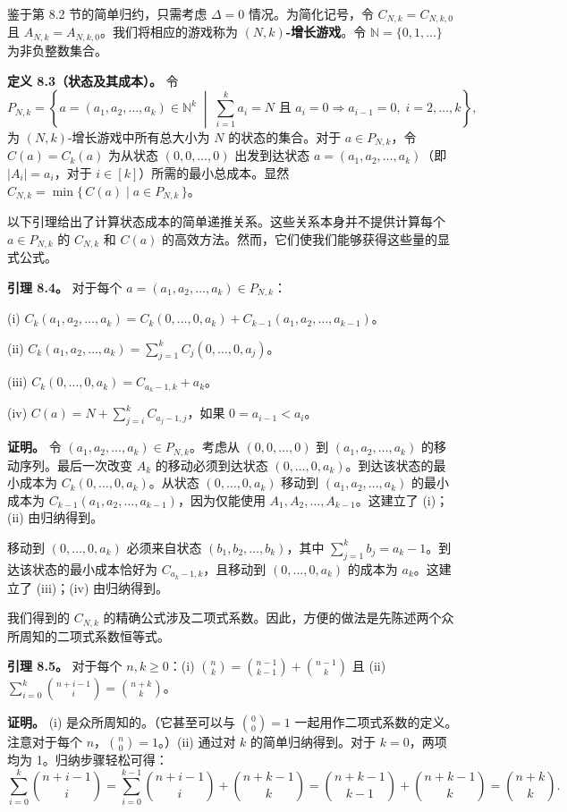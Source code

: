 \documentclass[12pt,a4paper]{ctexart}
\theoremstyle{remark}
\begin{document}
鉴于第 8.2 节的简单归约，只需考虑 $\Delta=0$ 情况。为简化记号，令 $C_{N,k}=C_{N,k,0}$ 且 $A_{N,k}=A_{N,k,0}$。我们将相应的游戏称为 $(N,k)$\textbf{-增长游戏}。令 $\mathbb{N}=\{0,1,\ldots\}$ 为非负整数集合。

\textbf{定义 8.3（状态及其成本）。} 令
$$P_{N,k}=\left\{ a=(a_1,a_2,\ldots,a_k)\in\mathbb{N}^k \;\middle|\; \sum_{i=1}^{k}a_i=N \text{ 且 } a_i=0\Rightarrow a_{i-1}=0,\; i=2,\ldots,k \right\},$$
为 $(N,k)$-增长游戏中所有总大小为 $N$ 的状态的集合。对于 $a\in P_{N,k}$，令 $C(a)=C_k(a)$ 为从状态 $(0,0,\ldots,0)$ 出发到达状态 $a=(a_1,a_2,\ldots,a_k)$（即 $|A_i|=a_i$，对于 $i\in[k]$）所需的最小总成本。显然 $C_{N,k}=\min\{\,C(a)\mid a\in P_{N,k}\,\}$。

以下引理给出了计算状态成本的简单递推关系。这些关系本身并不提供计算每个 $a\in P_{N,k}$ 的 $C_{N,k}$ 和 $C(a)$ 的高效方法。然而，它们使我们能够获得这些量的显式公式。

\textbf{引理 8.4。} 对于每个 $a=(a_1,a_2,\ldots,a_k)\in P_{N,k}$：

(i) $C_k(a_1,a_2,\ldots,a_k)=C_k(0,\ldots,0,a_k)+C_{k-1}(a_1,a_2,\ldots,a_{k-1})$。

(ii) $C_k(a_1,a_2,\ldots,a_k)=\sum_{j=1}^{k}C_j(0,\ldots,0,a_j)$。

(iii) $C_k(0,\ldots,0,a_k)=C_{a_k-1,k}+a_k$。

(iv) $C(a)=N+\sum_{j=i}^{k}C_{a_j-1,j}$，如果 $0=a_{i-1}<a_i$。

\textbf{证明。} 令 $(a_1,a_2,\ldots,a_k)\in P_{N,k}$。考虑从 $(0,0,\ldots,0)$ 到 $(a_1,a_2,\ldots,a_k)$ 的移动序列。最后一次改变 $A_k$ 的移动必须到达状态 $(0,\ldots,0,a_k)$。到达该状态的最小成本为 $C_k(0,\ldots,0,a_k)$。从状态 $(0,\ldots,0,a_k)$ 移动到 $(a_1,a_2,\ldots,a_k)$ 的最小成本为 $C_{k-1}(a_1,a_2,\ldots,a_{k-1})$，因为仅能使用 $A_1,A_2,\ldots,A_{k-1}$。这建立了 (i)；(ii) 由归纳得到。

移动到 $(0,\ldots,0,a_k)$ 必须来自状态 $(b_1,b_2,\ldots,b_k)$，其中 $\sum_{j=1}^{k}b_j=a_k-1$。到达该状态的最小成本恰好为 $C_{a_k-1,k}$，且移动到 $(0,\ldots,0,a_k)$ 的成本为 $a_k$。这建立了 (iii)；(iv) 由归纳得到。

我们得到的 $C_{N,k}$ 的精确公式涉及二项式系数。因此，方便的做法是先陈述两个众所周知的二项式系数恒等式。

\textbf{引理 8.5。} 对于每个 $n,k\geq 0$：(i) $\binom{n}{k}=\binom{n-1}{k-1}+\binom{n-1}{k}$ 且 (ii) $\sum_{i=0}^{k}\binom{n+i-1}{i}=\binom{n+k}{k}$。

\textbf{证明。} (i) 是众所周知的。（它甚至可以与 $\binom{0}{0}=1$ 一起用作二项式系数的定义。注意对于每个 $n$，$\binom{n}{0}=1$。）(ii) 通过对 $k$ 的简单归纳得到。对于 $k=0$，两项均为 1。归纳步骤轻松可得：
$$\sum_{i=0}^{k}\binom{n+i-1}{i} = \sum_{i=0}^{k-1}\binom{n+i-1}{i} + \binom{n+k-1}{k} = \binom{n+k-1}{k-1} + \binom{n+k-1}{k} = \binom{n+k}{k}.$$
\end{document}
